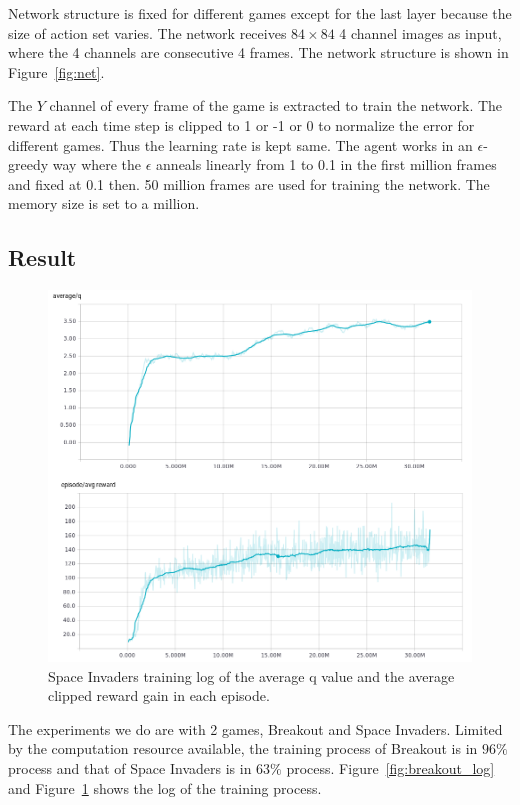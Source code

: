 \documentclass[10pt,twocolumn,letterpaper]{article}
\begin{document}
\begin{CJK}{UTF8}{gbsn}
Network structure is fixed for different games except for the last layer because the size of action set varies. The network receives $84\times 84$ 4 channel images as input, where the 4 channels are consecutive 4 frames. The network structure is shown in Figure~\ref{fig:net}. 

The $Y$ channel of every frame of the game is extracted to train the network. The reward at each time step is clipped to 1 or -1 or 0 to normalize the error for different games. Thus the learning rate is kept same. The agent works in an $\epsilon$-greedy way where the $\epsilon$ anneals linearly from 1 to 0.1 in the first million frames and fixed at 0.1 then. 50 million frames are used for training the network. The memory size is set to a million.

\subsection{Result}

\begin{figure}
\begin{center}
   \includegraphics[width=0.65\linewidth]{space_res.PNG}
\end{center}
\caption{Space Invaders training log of the average q value and the average clipped reward gain in each episode.}
\label{fig:space_log}
\end{figure}

The experiments we do are with 2 games, Breakout and Space Invaders. Limited by the computation resource available, the training process of Breakout is in $96\%$ process and that of Space Invaders is in $63\%$ process. Figure~\ref{fig:breakout_log} and Figure~\ref{fig:space_log} shows the log of the training process. 


\end{CJK}
\end{document}
